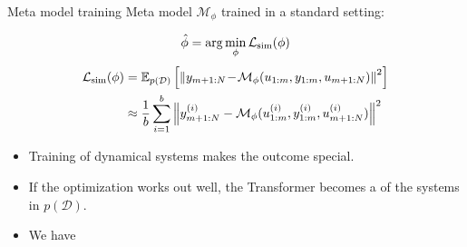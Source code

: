 \documentclass{beamer}
\newcommand{\free}{\mathcal{M}}
\newcommand{\D}{\mathcal{D}}
\newcommand{\nsamp}{N}
\newcommand{\norm}[1]{\left\lVert#1\right\rVert}
\newcommand{\E}{\mathbb{E}}
\begin{document}
\begin{frame}{Meta model training}
Meta model $\free_\phi$ trained in a standard  setting: 
\begin{small}
     $$\hat \phi = \arg \min_\phi \mathcal{L}_{\rm sim}(\phi)$$
\begin{align*}
     \mathcal{L}_{\rm sim}(\phi)   &=   \E_{p(\D)}
     \left [
     \norm{y_{m+1:\nsamp} \! - \! \free_\phi (u_{1:m}, y_{1:m}, u_{m+1:\nsamp})
     }^2
     \right ] \\
      & \approx
     \frac{1}{b}
     \sum_{i=1}^b
     \norm{y_{m+1:\nsamp}^{(i)} - \free_\phi (u_{1:m}^{(i)}, y_{1:m}^{(i)}, u_{m+1:\nsamp}^{(i)})}^2
\end{align*}
\end{small}

\pause
\begin{itemize}
\item Training  of dynamical systems
makes the outcome special.
\item If the optimization works out well, the Transformer becomes a  of the systems in $p(\D)$.
\item We have 
\end{itemize}
\end{frame}
\end{document}
